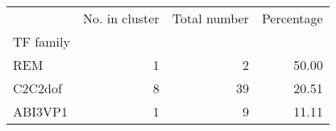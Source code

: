 \begin{tabular}{lrrr}
\toprule
{} &  No. in cluster &  Total number &  Percentage \\
TF family &                 &               &             \\
\midrule
REM       &               1 &             2 &       50.00 \\
C2C2dof   &               8 &            39 &       20.51 \\
ABI3VP1   &               1 &             9 &       11.11 \\
\bottomrule
\end{tabular}
